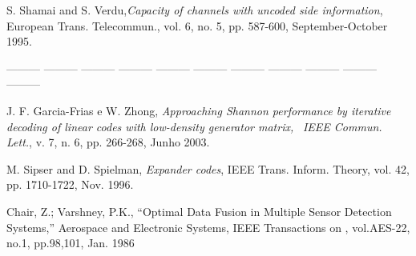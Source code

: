 \documentclass[journal]{IEEEtran}
\begin{document}
\begin{thebibliography}{1}
  
  
S. Shamai and S. Verdu,\emph{Capacity of channels with uncoded side information}, European Trans. Telecommun., vol. 6,
no. 5, pp. 587-600, September-October 1995.

 --------- --------- --------- --------- --------- --------- --------- 
--------- --------- --------- --------- 


 J. F. Garcia-Frias e W. Zhong, \emph{Approaching Shannon performance by
iterative decoding of linear codes with low-density generator matrix,}
~\textit{IEEE Commun. Lett.}, v. 7, n. 6, pp. 266-268, Junho 2003.





 M. Sipser and D. Spielman, \emph{Expander codes}, IEEE Trans. Inform.
Theory, vol. 42, pp. 1710-1722, Nov. 1996.

 Chair, Z.; Varshney, P.K., ``Optimal Data Fusion in Multiple Sensor Detection Systems,'' 
Aerospace and Electronic Systems, IEEE Transactions on , vol.AES-22, no.1, pp.98,101, Jan. 1986


\end{thebibliography}
\end{document}
